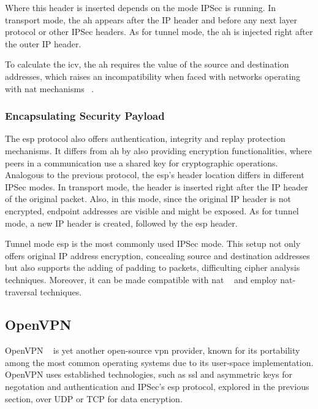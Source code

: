 \documentclass[11pt,twoside,a4paper]{report}
\begin{document}
Where this header is inserted depends on the mode IPSec is running. In transport mode, the \acrshort{ah} appears after the IP header and before any next layer protocol or other IPSec headers. As for tunnel mode, the \acrshort{ah} is injected right after the outer IP header.

To calculate the \acrshort{icv}, the \acrshort{ah} requires the value of the source and destination addresses, which raises an incompatibility when faced with networks operating with \acrshort{nat} mechanisms ~\cite{frankel2005guide}.

\subsubsection{Encapsulating Security Payload}

The \acrshort{esp} protocol also offers authentication, integrity and replay protection mechanisms. It differs from \acrshort{ah} by also providing encryption functionalities, where peers in a communication use a shared key for cryptographic operations. Analogous to the previous protocol, the \acrshort{esp}'s header location differs in different IPSec modes. In transport mode, the header is inserted right after the IP header of the original packet. Also, in this mode, since the original IP header is not encrypted, endpoint addresses are visible and might be exposed. As for tunnel mode, a new IP header is created, followed by the \acrshort{esp} header.

Tunnel mode \acrshort{esp} is the most commonly used IPSec mode. This setup not only offers original IP address encryption, concealing source and destination addresses but also supports the adding of padding to packets, difficulting cipher analysis techniques. Moreover, it can be made compatible with \acrshort{nat} ~\cite{} and employ \acrshort{nat}-traversal techniques.

\subsection{OpenVPN}

OpenVPN ~\cite{ovpnwebsite} is yet another open-source \acrshort{vpn} provider, known for its portability among the most common operating systems due to its user-space implementation. OpenVPN uses established technologies, such as \acrshort{ssl} and asymmetric keys for negotation and authentication and IPSec's \acrshort{esp} protocol, explored in the previous section, over UDP or TCP for data encryption.
\end{document}
